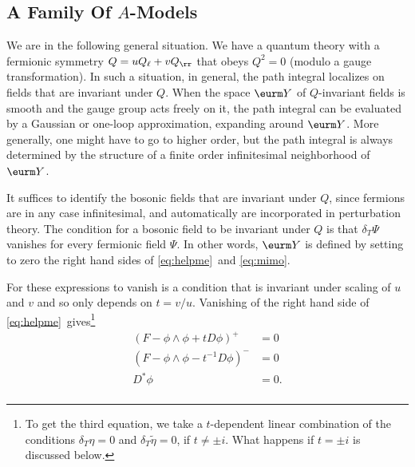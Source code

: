 
\subsection{A Family Of $A$-Models}

\label{sec:familya}

We are in the following general situation.  We have a quantum
theory with a fermionic symmetry $Q=uQ_\ell+vQ_\rr$ that obeys
$Q^2=0$ (modulo a gauge transformation). In such a situation, in
general, the path integral localizes on fields that are invariant
under $Q$. When the space $\eurm Y$ of $Q$-invariant fields is
smooth and the gauge group acts freely on it, the path integral
can be evaluated by a Gaussian or one-loop approximation,
expanding around $\eurm Y$. More generally, one might have to go
to higher order, but the path integral is always determined by the
structure of a finite order infinitesimal neighborhood of $\eurm
Y$.

It suffices to identify the bosonic fields that are invariant
under $Q$, since fermions are in any case infinitesimal, and
automatically are incorporated in perturbation theory.  The
condition for a bosonic field to be invariant under $Q$ is that
$\delta_T\Psi$ vanishes for every fermionic field $\Psi$.  In
other words, $\eurm Y$ is defined by setting to zero the right
hand sides of \eqref{eq:helpme}\ and \eqref{eq:mimo}.

For these expressions to vanish is a condition that is invariant
under scaling of $u$ and $v$ and so only depends on $t=v/u$.
Vanishing of the right hand side of \eqref{eq:helpme}\ gives\footnote{To get the
third equation, we take a $t$-dependent linear combination of  the
conditions $\delta_T\eta=0$ and $\delta_T\tilde\eta=0$, if
$t\not=\pm i$.  What happens if $t=\pm i$ is discussed below.}
\setcounter{equation}{28}
\begin{equation}\label{eq:loopme}
\begin{aligned}(F-\phi\wedge\phi+tD\phi)^+ & = 0
\\
                      (F-\phi\wedge\phi-t^{-1}D\phi)^-& = 0 \\
                      D^* \phi & = 0.\\\end{aligned}
\end{equation}

